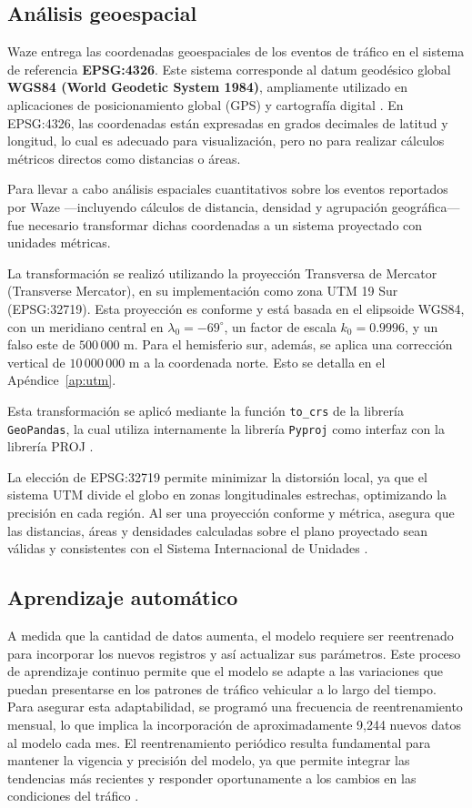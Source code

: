 \documentclass[12pt]{article}
\begin{document}
\subsection{Análisis geoespacial}

Waze entrega las coordenadas geoespaciales de los eventos de tráfico en el sistema de referencia \textbf{EPSG:4326}. Este sistema corresponde al datum geodésico global \textbf{WGS84 (World Geodetic System 1984)}, ampliamente utilizado en aplicaciones de posicionamiento global (GPS) y cartografía digital \citep{epsg4326, wgs84_nima}. En EPSG:4326, las coordenadas están expresadas en grados decimales de latitud y longitud, lo cual es adecuado para visualización, pero no para realizar cálculos métricos directos como distancias o áreas.

Para llevar a cabo análisis espaciales cuantitativos sobre los eventos reportados por Waze —incluyendo cálculos de distancia, densidad y agrupación geográfica— fue necesario transformar dichas coordenadas a un sistema proyectado con unidades métricas.

La transformación se realizó utilizando la proyección Transversa de Mercator (Transverse Mercator), en su implementación como zona UTM 19 Sur (EPSG:32719). Esta proyección es conforme y está basada en el elipsoide WGS84, con un meridiano central en $\lambda_0 = -69^\circ$, un factor de escala $k_0 = 0.9996$, y un falso este de $500\,000$ m. Para el hemisferio sur, además, se aplica una corrección vertical de $10\,000\,000$ m a la coordenada norte. Esto se detalla en el Apéndice~\ref{ap:utm}.

Esta transformación se aplicó mediante la función \texttt{to\_crs} de la librería \texttt{GeoPandas}, la cual utiliza internamente la librería \texttt{Pyproj} como interfaz con la librería PROJ \citep{gdal_proj, pyproj, geopandas}.

La elección de EPSG:32719 permite minimizar la distorsión local, ya que el sistema UTM divide el globo en zonas longitudinales estrechas, optimizando la precisión en cada región. Al ser una proyección conforme y métrica, asegura que las distancias, áreas y densidades calculadas sobre el plano proyectado sean válidas y consistentes con el Sistema Internacional de Unidades \citep{epsg32719}.

\subsection{Aprendizaje automático}

A medida que la cantidad de datos aumenta, el modelo requiere ser reentrenado para incorporar los nuevos registros y así actualizar sus parámetros. Este proceso de aprendizaje continuo permite que el modelo se adapte a las variaciones que puedan presentarse en los patrones de tráfico vehicular a lo largo del tiempo. Para asegurar esta adaptabilidad, se programó una frecuencia de reentrenamiento mensual, lo que implica la incorporación de aproximadamente 9,244 nuevos datos al modelo cada mes. El reentrenamiento periódico resulta fundamental para mantener la vigencia y precisión del modelo, ya que permite integrar las tendencias más recientes y responder oportunamente a los cambios en las condiciones del tráfico \citep{gama2014concept}.
\end{document}
